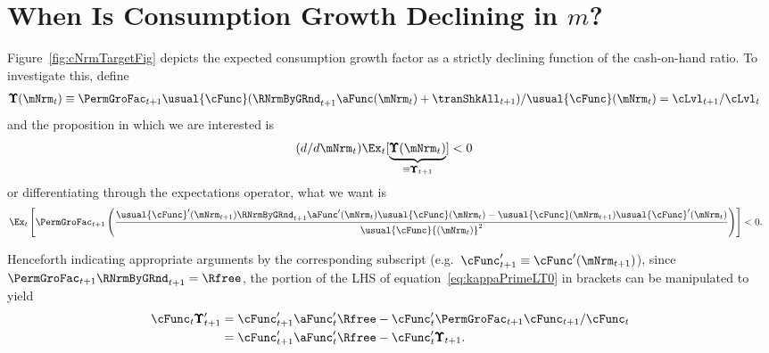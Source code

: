 \documentclass[\econtexRoot/BufferStockTheory]{subfiles}
\begin{document}
\hypertarget{ApndxCGrowthDeclines}{}
\section{When Is Consumption Growth Declining in \texorpdfstring{$m$}{m}?}\label{sec:ApndxCGrowthDeclines}\label{subsec:dcgdxneg}

Figure~\ref{fig:cNrmTargetFig} depicts the expected consumption growth factor as a strictly
declining function of the cash-on-hand ratio. To investigate this,
define
\begin{align*}
  \pmb{\Upsilon}(\mNrm_{t})  & \equiv  \PermGroFac_{t+1} \usual{\cFunc}(\RNrmByGRnd_{t+1}\aFunc(\mNrm_{t})+\tranShkAll_{t+1})/\usual{\cFunc}(\mNrm_{t})  = \cLvl_{t+1}/\cLvl_{t}
\end{align*}
and the proposition in which we are interested is
\begin{align*}
  (d/d\mNrm_{t})\Ex_{t}[\underbrace{\pmb{\Upsilon}(\mNrm_{t})}_{\equiv \pmb{\Upsilon}_{t+1}}]  & < 0  
\end{align*}
or differentiating through the expectations operator, what we want is
\begin{equation}\begin{gathered}\begin{aligned}
  \Ex_{t}\left[\PermGroFac_{t+1} \left(\frac{\usual{\cFunc}^{\prime}(\mNrm_{t+1})\RNrmByGRnd_{t+1}\aFunc^{\prime}(\mNrm_{t})\usual{\cFunc}(\mNrm_{t})-\usual{\cFunc}(\mNrm_{t+1})\usual{\cFunc}^{\prime}(\mNrm_{t})}{\usual{\cFunc}{(\mNrm_{t})}^{2}}\right)\right]  & < 0 \label{eq:kappaPrimeLT0}.
\end{aligned}\end{gathered}\end{equation}

Henceforth indicating appropriate arguments by the corresponding
subscript (e.g.\ $\cFunc_{t+1}^{\prime} \equiv \cFunc^{\prime}(\mNrm_{t+1})$), since
$\PermGroFac_{t+1}\RNrmByGRnd_{t+1}=\Rfree$, the portion of the LHS of equation~\eqref{eq:kappaPrimeLT0} in brackets can be manipulated to yield
\begin{equation}\begin{gathered}\begin{aligned}
  \cFunc_{t} \pmb{\Upsilon}^{\prime}_{t+1}  & = \cFunc^{\prime}_{t+1}\aFunc^{\prime}_{t}\Rfree-\cFunc^{\prime}_{t} \PermGroFac_{t+1} \cFunc_{t+1}/\cFunc_{t} \nonumber
  \\  & = \cFunc^{\prime}_{t+1}\aFunc^{\prime}_{t}\Rfree-\cFunc^{\prime}_{t} \pmb{\Upsilon}_{t+1} \label{eq:cPrimek}
        .
\end{aligned}\end{gathered}\end{equation}
\end{document}
